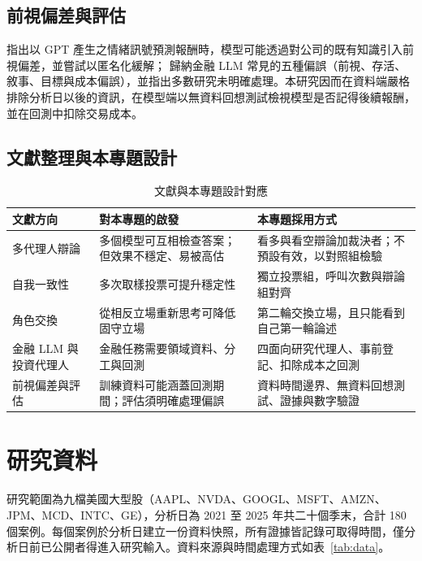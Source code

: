 \documentclass[12pt,a4paper]{article}
\begin{document}
\begin{CJK}{UTF8}{bkai}
\subsection{前視偏差與評估}

\citet{glasserman2023lookahead} 指出以 GPT 產生之情緒訊號預測報酬時，模型可能透過對公司的既有知識引入前視偏差，並嘗試以匿名化緩解；\citet{kong2026bias} 歸納金融 LLM 常見的五種偏誤（前視、存活、敘事、目標與成本偏誤），並指出多數研究未明確處理。本研究因而在資料端嚴格排除分析日以後的資訊，在模型端以無資料回想測試檢視模型是否記得後續報酬，並在回測中扣除交易成本。

\subsection{文獻整理與本專題設計}

\begin{table}[H]
\centering\small
\caption{文獻與本專題設計對應}
\label{tab:litmap}
\begin{tabularx}{\textwidth}{@{}l Y Y@{}}
\toprule
文獻方向 & 對本專題的啟發 & 本專題採用方式 \\
\midrule
多代理人辯論 & 多個模型可互相檢查答案；但效果不穩定、易被高估 & 看多與看空辯論加裁決者；不預設有效，以對照組檢驗 \\
自我一致性 & 多次取樣投票可提升穩定性 & 獨立投票組，呼叫次數與辯論組對齊 \\
角色交換 & 從相反立場重新思考可降低固守立場 & 第二輪交換立場，且只能看到自己第一輪論述 \\
金融 LLM 與投資代理人 & 金融任務需要領域資料、分工與回測 & 四面向研究代理人、事前登記、扣除成本之回測 \\
前視偏差與評估 & 訓練資料可能涵蓋回測期間；評估須明確處理偏誤 & 資料時間邊界、無資料回想測試、證據與數字驗證 \\
\bottomrule
\end{tabularx}
\end{table}

\section{研究資料}
\label{sec:data}

研究範圍為九檔美國大型股（AAPL、\allowbreak NVDA、\allowbreak GOOGL、\allowbreak MSFT、\allowbreak AMZN、\allowbreak JPM、\allowbreak MCD、\allowbreak INTC、\allowbreak GE），分析日為 2021 至 2025 年共二十個季末，合計 180 個案例。每個案例於分析日建立一份資料快照，所有證據皆記錄可取得時間，僅分析日前已公開者得進入研究輸入。資料來源與時間處理方式如表~\ref{tab:data}。


\end{CJK}
\end{document}

